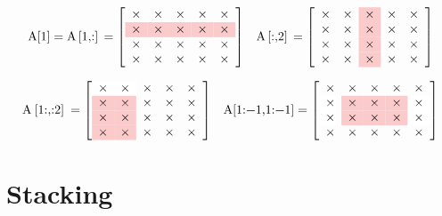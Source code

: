 \begin{align*}
\text{\li{A[1]}} = \text{\li{A[1,:]}} = \left[\begin{array}{rrrrr}
\times & \times & \times & \times & \times\\
\rowcolor{red!20}
\times & \times & \times & \times & \times\\
\times & \times & \times & \times & \times\\
\times & \times & \times & \times & \times\\
\end{array}\right]
&&
\text{\li{A[:,2]}} = \left[\begin{array}{rr>{\columncolor{red!20}}rrr}
\times & \times & \times & \times & \times\\
\times & \times & \times & \times & \times\\
\times & \times & \times & \times & \times\\
\times & \times & \times & \times & \times\\
\end{array}\right]
\end{align*}

\begin{align*}
\text{\li{A[1:,:2]}} = \left[\begin{array}{>{\columncolor{red!20}}r>{\columncolor{red!20}}rrrr}
\cellcolor{white}\times & \cellcolor{white}\times & \times & \times & \times\\
\times & \times & \times & \times & \times\\
\times & \times & \times & \times & \times\\
\times & \times & \times & \times & \times
\end{array}\right]
&&
\text{\li{A[1:-1,1:-1]}} = \left[\begin{array}{rrrrr}
\times & \times & \times & \times & \times\\
\rowcolor{red!20}
\cellcolor{white}\times & \times & \times & \times & \cellcolor{white}\times\\
\rowcolor{red!20}
\cellcolor{white}\times & \times & \times & \times & \cellcolor{white}\times\\
\times & \times & \times & \times & \times\end{array}\right]
\end{align*}

\section*{Stacking} %

